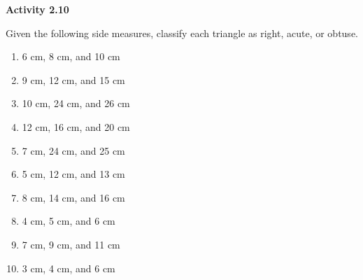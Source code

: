  \vspace{1ex}
\noindent\textbf{Activity 2.10}

\vspace{0.75ex}

Given the following side measures, classify each triangle as right, acute, or obtuse.

\begin{multicols}{2}
\begin{enumerate}[noitemsep, label = \color{blue}\arabic*. ]
    \item 6 cm, 8 cm, and 10 cm
    \item 9 cm, 12 cm, and 15 cm
    \item 10 cm, 24 cm, and 26 cm
    \item 12 cm, 16 cm, and 20 cm
    \item 7 cm, 24 cm, and 25 cm
    \item 5 cm, 12 cm, and 13 cm
    \item 8 cm, 14 cm, and 16 cm
    \item 4 cm, 5 cm, and 6 cm
    \item 7 cm, 9 cm, and 11 cm
    \item 3 cm, 4 cm, and 6 cm
\end{enumerate}
\end{multicols}
 
